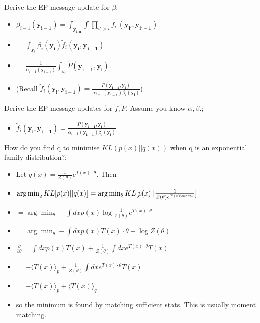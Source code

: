 \documentclass{article}
\begin{document}
Derive the EP message update for $\beta$; \begin{itemize} \item $\beta_{i-1}(\mathbf{y_{i-1}}) = \int_{\mathbf{y_{i:n}}} \int \prod_{i'>i} \tilde{f}_{i'}(\mathbf{y_{i'}, \mathbf{y}_{i'-1}})  $ \item $= \int_{\mathbf{y_{i}}}\beta_{i}(\mathbf{y_{i}})\tilde{f}_i(\mathbf{y_i, y_{i-1}})$ \item $= \frac{1}{\alpha_{i-1}(\mathbf{y}_{i-1})}\int_{y_{i}}\tilde{P}(\mathbf{y_{i-1},y_i})$. \item (Recall $\tilde{f}_i(\mathbf{y_i, y_{i-1}}) = \frac{\tilde{P}(\mathbf{y_{i-1}, y_i})}{\alpha_{i-1}(\mathbf{y_{i-1}})\beta_i(\mathbf{y_i})}$) \end{itemize} 

Derive the EP message updates for $\tilde{f}, \tilde{P}$. Assume you know $\alpha, \beta$.; \begin{itemize} \item $\tilde{f}_i(\mathbf{y_i, y_{i-1}}) = \frac{\tilde{P}(\mathbf{y_{i-1}, y_i})}{\alpha_{i-1}(\mathbf{y_{i-1}})\beta_i(\mathbf{y_i})}$ \end{itemize}

How do you find q to minimise $KL(p(x)||q(x))$ when q is an exponential family  distribution?; \begin{itemize} \item Let $q(x) = \frac{1}{Z(\theta)}e^{T(x)\cdot\theta}$. Then \item $\arg\min_q KL[p(x)||q(x)] = \arg\min_{\theta} KL[p(x)||\frac{1}{Z(\theta)e^{T(x)\dcdot\theta}}]$ \item $= \arg\min_{\theta} - \int dx p(x) \log \frac{1}{Z(\theta)}e^{T(x)\cdot\theta}$ \item $= \arg\min_{\theta} - \int dx p(x)T(x)\cdot \theta + \log Z(\theta)$ \item $\frac{\partial}{\partial \theta} = \int dx p(x) T(x) + \frac{1}{Z(\theta)}\int dx e^{T(x)\cdot \theta} T(x)$ \item $= -\langle T(x) \rangle_p + \frac{1}{Z(\theta)}\int dx e^{T(x)\cdot \theta} T(x)$ \item $ = - \langle T(x)\rangle_p + \langle T(x) \rangle_q$. \item so the minimum is found by matching sufficient stats. This is usually moment matching. \end{itemize}
\end{document}
